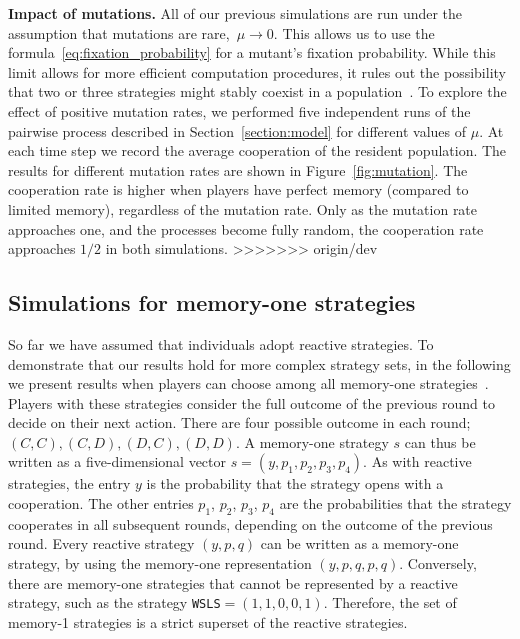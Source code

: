 \documentclass[11pt]{article}
\def\strategy{s}
\theoremstyle{plainCl1}
\theoremstyle{plainCl2}
\begin{document}
\noindent
{\bf Impact of mutations.} 
All of our previous simulations are run under the assumption that mutations are rare,~$\mu\!\rightarrow\!0$. 
This allows us to use the formula~\eqref{eq:fixation_probability} for a mutant's fixation probability. 
While this limit allows for more efficient computation procedures, it rules out the possibility that two or three strategies might stably coexist in a population~\cite{tkadlec:pnas:2023}.
To explore the effect of positive mutation rates, we performed five independent runs of the pairwise process described in
Section~\ref{section:model} for different values of $\mu$.
At each time step we record the average cooperation of the resident population. 
The results for different mutation rates are shown in Figure~\ref{fig:mutation}. 
The cooperation rate is higher when players have perfect memory (compared to limited memory), regardless of the
mutation rate. 
Only as the mutation rate approaches one, and the processes become fully random, the cooperation rate approaches $1/2$ in both simulations.
>>>>>>> origin/dev



\subsection{Simulations for memory-one strategies}\label{section:memory_one}

So far we have assumed that individuals adopt reactive strategies.
To demonstrate that our results hold for more complex strategy sets, 
in the following we present results when players can choose among all memory-one strategies~\citep{sigmund2010calculus}. 
Players with these strategies consider the full outcome of the
previous round to decide on their next action. 
There are four possible outcome in each
round; \((C, C), (C, D), (D, C), (D, D)\). 
A memory-one strategy \(\strategy\) can thus be
written as a five-dimensional vector \(\strategy=(y, p_1, p_2, p_3, p_4)\). 
As with reactive strategies, the entry \(y\) is the probability that the strategy opens with a cooperation.
The other entries \(p_1\), \(p_2\), \(p_3\), \(p_4\) are the probabilities that the strategy
cooperates in all subsequent rounds, depending on the outcome of the previous round.
Every reactive strategy $(y,p,q)$ can be written as a memory-one strategy, by using the memory-one representation $(y,p,q,p,q)$.
Conversely, there are memory-one strategies that cannot be represented by a reactive strategy, such as the strategy \texttt{WSLS}$=(1,1,0,0,1)$. 
Therefore, the set of memory-1 strategies is a strict superset of the reactive strategies. 
\end{document}
